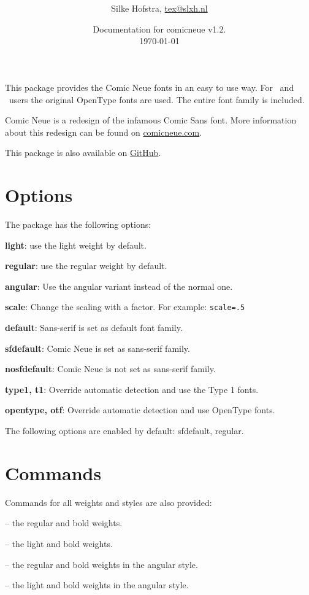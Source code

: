 \documentclass[10pt,a4paper,english,twocolumn]{article}
\title{%
	\vspace{-4em}
	\comicneuelight
	\resizebox{\linewidth}{!}{comicneue}\\
	\resizebox{\linewidth}{!}{Craig Rozynski's Comic Neue fonts for \LaTeX}
}
\author{Silke Hofstra, \href{mailto:tex@slxh.nl}{tex@slxh.nl}}
\date{Documentation for comicneue v1.2.\\ \today}
\begin{document}
\maketitle
This package provides the Comic Neue fonts in an easy to use way.
For \XeLaTeX\ and \LuaLaTeX\ users the original OpenType fonts are used.
The entire font family is included.

Comic Neue is a redesign of the infamous Comic Sans font.
More information about this redesign can be found on \href{http://comicneue.com/}{comicneue.com}.

This package is also available on \href{https://github.com/silkeh/latex-comicneue}{GitHub}.

\section{Options}
The package has the following options:
\begin{itemize*}
	\item \textbf{light}:          use the light weight by default.
	\item \textbf{regular}:        use the regular weight by default.
	\item \textbf{angular}:        Use the angular variant instead of the normal one.
	\item \textbf{scale}:          Change the scaling with a factor. For example:  \texttt{scale=.5}
	\item \textbf{default}:        Sans-serif is set as default font family.
	\item \textbf{sfdefault}:      Comic Neue is set as sans-serif family.
	\item \textbf{nosfdefault}:    Comic Neue is not set as sans-serif family.
	\item \textbf{type1, t1}:      Override automatic detection and use the Type 1 fonts.
	\item \textbf{opentype, otf}:  Override automatic detection and use OpenType fonts.
\end{itemize*}
The following options are enabled by default: sfdefault, regular.

\section{Commands}
Commands for all weights and styles are also provided:
\begin{itemize*}
	\item {}
		-- the regular and bold weights.
	\item {}
		-- the light and bold weights.
	\item {}
		-- the regular and bold weights in the angular style.
	\item {}
		-- the light and bold weights in the angular style.
\end{itemize*}
\end{document}

